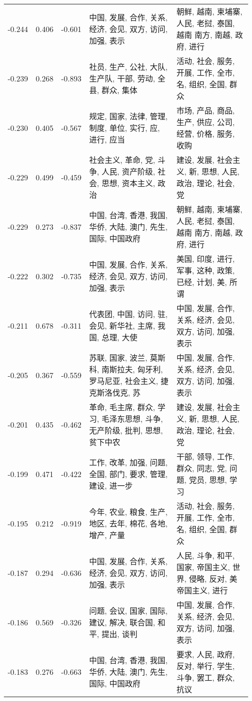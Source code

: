 \begin{tabular}{cccp{5cm}p{5cm}}
-0.244 & 0.406 & -0.601 & 中国, 发展, 合作, 关系, 经济, 会见, 双方, 访问, 加强, 表示 & 朝鲜, 越南, 柬埔寨, 人民, 老挝, 泰国, 越南 南方, 南越, 政府, 进行 \\
-0.239 & 0.268 & -0.893 & 社员, 生产, 公社, 大队, 生产队, 干部, 劳动, 全县, 群众, 集体 & 活动, 社会, 服务, 开展, 工作, 全市, 名, 组织, 全国, 群众 \\
-0.230 & 0.405 & -0.567 & 规定, 国家, 法律, 管理, 制度, 单位, 实行, 应, 进行, 应当 & 市场, 产品, 商品, 生产, 供应, 公司, 经营, 价格, 服务, 收购 \\
-0.229 & 0.499 & -0.459 & 社会主义, 革命, 党, 斗争, 人民, 资产阶级, 社会, 思想, 资本主义, 政治 & 建设, 发展, 社会主义, 新, 思想, 人民, 政治, 理论, 社会, 党 \\
-0.229 & 0.273 & -0.837 & 中国, 台湾, 香港, 我国, 华侨, 大陆, 澳门, 先生, 国际, 中国政府 & 朝鲜, 越南, 柬埔寨, 人民, 老挝, 泰国, 越南 南方, 南越, 政府, 进行 \\
-0.222 & 0.302 & -0.735 & 中国, 发展, 合作, 关系, 经济, 会见, 双方, 访问, 加强, 表示 & 美国, 印度, 进行, 军事, 这种, 政策, 已经, 计划, 美, 所谓 \\
-0.211 & 0.678 & -0.311 & 代表团, 中国, 访问, 驻, 会见, 新华社, 主席, 我国, 总理, 大使 & 中国, 发展, 合作, 关系, 经济, 会见, 双方, 访问, 加强, 表示 \\
-0.205 & 0.367 & -0.559 & 苏联, 国家, 波兰, 莫斯科, 南斯拉夫, 匈牙利, 罗马尼亚, 社会主义, 捷克斯洛伐克, 苏 & 中国, 发展, 合作, 关系, 经济, 会见, 双方, 访问, 加强, 表示 \\
-0.201 & 0.435 & -0.462 & 革命, 毛主席, 群众, 学习, 毛泽东思想, 斗争, 无产阶级, 批判, 思想, 贫下中农 & 建设, 发展, 社会主义, 新, 思想, 人民, 政治, 理论, 社会, 党 \\
-0.199 & 0.471 & -0.422 & 工作, 改革, 加强, 问题, 全国, 部门, 要求, 管理, 建设, 进一步 & 干部, 领导, 工作, 群众, 同志, 党, 问题, 党员, 思想, 学习 \\
-0.195 & 0.212 & -0.919 & 今年, 农业, 粮食, 生产, 地区, 去年, 棉花, 各地, 增产, 产量 & 活动, 社会, 服务, 开展, 工作, 全市, 名, 组织, 全国, 群众 \\
-0.187 & 0.294 & -0.636 & 中国, 发展, 合作, 关系, 经济, 会见, 双方, 访问, 加强, 表示 & 人民, 斗争, 和平, 国家, 帝国主义, 世界, 侵略, 反对, 美帝国主义, 进行 \\
-0.186 & 0.569 & -0.326 & 问题, 会议, 国家, 国际, 建议, 解决, 联合国, 和平, 提出, 谈判 & 中国, 发展, 合作, 关系, 经济, 会见, 双方, 访问, 加强, 表示 \\
-0.183 & 0.276 & -0.663 & 中国, 台湾, 香港, 我国, 华侨, 大陆, 澳门, 先生, 国际, 中国政府 & 要求, 人民, 政府, 反对, 举行, 学生, 斗争, 罢工, 群众, 抗议 \\

\end{tabular}

